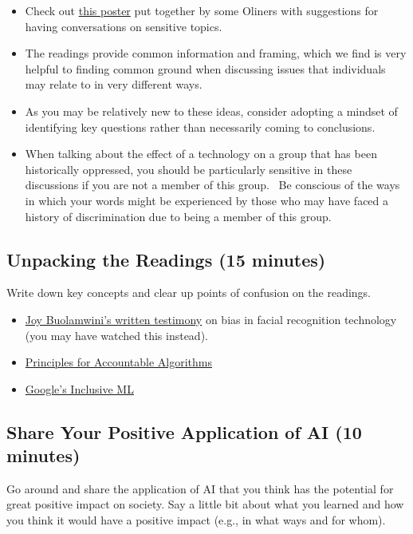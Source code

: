 \begin{itemize}
\item Check out \href{https://drive.google.com/file/d/1RZ9VHbWvsJwDbyF6zrmkd5mUdINrzt_f/view}{this poster} put together by some Oliners with suggestions for having conversations on sensitive topics.
\item The readings provide common information and framing, which we find is very helpful to finding common ground when discussing issues that individuals may relate to in very different ways.
\item As you may be relatively new to these ideas, consider adopting a mindset of identifying key questions rather than necessarily coming to conclusions.
\item When talking about the effect of a technology on a group that has been historically oppressed, you should be particularly sensitive in these discussions if you are not a member of this group.  Be conscious of the ways in which your words might be experienced by those who may have faced a history of discrimination due to being a member of this group.
\end{itemize}

\subsection{Unpacking the Readings (15 minutes)}
Write down key concepts and clear up points of confusion on the readings.

\begin{itemize}
\item \href{https://docs.house.gov/meetings/GO/GO00/20190522/109521/HHRG-116-GO00-Wstate-BuolamwiniJ-20190522.pdf}{Joy Buolamwini's written testimony} on bias in facial recognition technology (you may have watched this instead).
\item \href{https://www.fatml.org/resources/principles-for-accountable-algorithms}{Principles for Accountable Algorithms}
\item \href{https://cloud.google.com/inclusive-ml/}{Google's Inclusive ML}
\end{itemize}

\subsection{Share Your Positive Application of AI (10 minutes)}
Go around and share the application of AI that you think has the potential for great positive impact on society. Say a little bit about what you learned and how you think it would have a positive impact (e.g., in what ways and for whom).

